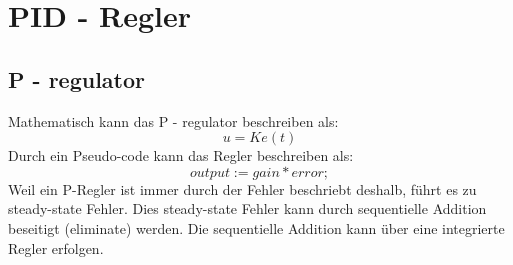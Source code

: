 \chapter{PID - Regler}

\section{P - regulator}

Mathematisch kann das P - regulator beschreiben als:
\begin{equation}
	u = K e(t)
\end{equation}
Durch ein Pseudo-code kann das Regler beschreiben als:
\begin{equation}
	output := gain * error;
\end{equation}
Weil ein P-Regler ist immer durch der Fehler beschriebt deshalb, f\"uhrt es zu steady-state Fehler. Dies steady-state Fehler kann durch sequentielle Addition beseitigt (eliminate) werden. Die sequentielle Addition kann \"uber eine integrierte Regler erfolgen.
